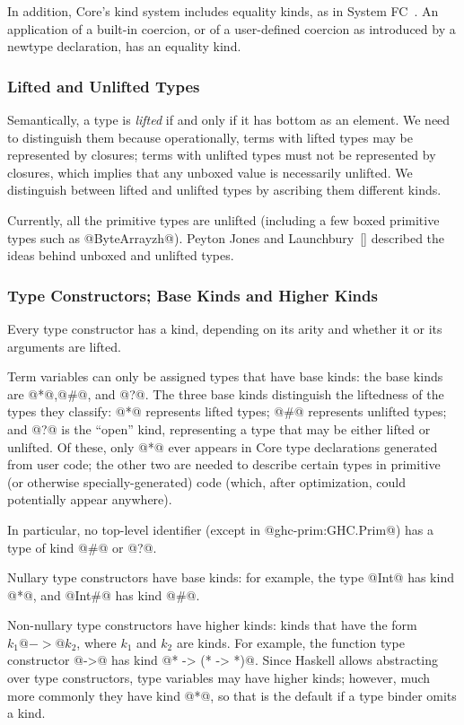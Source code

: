 \documentclass[10pt]{article}
\begin{document}
In addition, Core's kind system includes equality kinds, as in System FC~\citep{system-fc}. An application of a built-in coercion, or of a user-defined coercion as introduced by a newtype declaration, has an equality kind.
\subsubsection{Lifted and Unlifted Types}
Semantically, a type is {\it lifted} if and only if it has bottom as an element. We need to distinguish them because operationally, terms with lifted types may be represented by closures; terms with unlifted types must not be represented by closures, which implies that any unboxed value is necessarily unlifted. We distinguish between lifted and unlifted types by ascribing them different kinds.

Currently, all the primitive types are unlifted 
(including a few boxed primitive types such as @ByteArrayzh@).
Peyton Jones and Launchbury~[\citeyear{pj:unboxed}] described the ideas behind unboxed and unlifted types.

\subsubsection{Type Constructors; Base Kinds and Higher Kinds}
Every type constructor has a kind, depending on its arity and whether it or its arguments are lifted.

Term variables can only be assigned types that have base kinds: the base kinds are @*@,@#@, and @?@. The three base kinds distinguish the liftedness of the types they classify:
@*@ represents lifted types; @#@ represents unlifted types; and @?@ is the ``open'' kind, representing a type that may be either lifted or unlifted. Of these, only @*@ ever
appears in Core type declarations generated from user code; the other two are needed to describe
certain types in primitive (or otherwise specially-generated) code (which, after optimization, could potentially appear anywhere).

In particular, no top-level identifier (except in @ghc-prim:GHC.Prim@) has a type of kind @#@ or @?@.

Nullary type constructors have base kinds: for example, the type @Int@ has kind @*@, and @Int#@ has kind @#@.

Non-nullary type constructors have higher kinds: kinds that have the form $k_1 @->@ k_2$,
where $k_1$ and $k_2$ are kinds.   For example, the function type constructor
@->@ has kind @* -> (* -> *)@.  Since Haskell allows abstracting over type
constructors, type variables may have higher kinds; however, much more commonly they have kind @*@, so that is the default if a type binder omits a kind.
\end{document}

